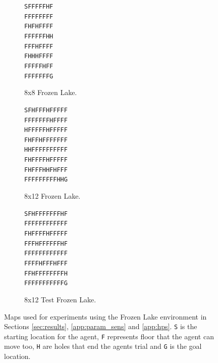             \begin{figure}
                \centering
                \begin{subfigure}[b]{0.3\textwidth}
                    \centering
                    \texttt{SFFFFFHF} \\
                    \texttt{FFFFFFFF} \\
                    \texttt{FHFHFFFF} \\
                    \texttt{FFFFFFHH} \\
                    \texttt{FFFHFFFF} \\
                    \texttt{FHHHFFFF} \\
                    \texttt{FFFFFHFF} \\
                    \texttt{FFFFFFFG} 
                    \caption{8x8 Frozen Lake.}
                    \label{fig:fl8}
                \end{subfigure}
                \hfill
                \begin{subfigure}[b]{0.3\textwidth}
                    \centering
                    \texttt{SFHFFFHFFFFF} \\
                    \texttt{FFFFFFFHFFFF} \\
                    \texttt{HFFFFFHFFFFF} \\
                    \texttt{FHFFHFFFFFFF} \\
                    \texttt{HHFFFFFFFFFF} \\
                    \texttt{FHFFFFHFFFFF} \\
                    \texttt{FHFFFHHFHFFF} \\
                    \texttt{FFFFFFFFFHHG} 
                    \caption{8x12 Frozen Lake.}
                    \label{fig:fl12}
                \end{subfigure}
                \hfill
                \begin{subfigure}[b]{0.3\textwidth}
                    \centering
                    \texttt{SFHFFFFFFFHF} \\
                    \texttt{FFFFFFFFFFFF} \\
                    \texttt{FHFFFFHFFFFF} \\
                    \texttt{FFFHFFFFFFHF} \\
                    \texttt{FFFFFFFFFFFF} \\
                    \texttt{FFFFHFFFHFFF} \\
                    \texttt{FFHFFFFFFFFH} \\
                    \texttt{FFFFFFFFFFFG} 
                    \caption{8x12 Test Frozen Lake.}
                    \label{fig:fl12test}
                \end{subfigure}
                \caption{Maps used for experiments using the Frozen Lake environment in Sections \ref{sec:results}, \ref{app:param_sens} and \ref{app:hps}. \texttt{S} is the starting location for the agent, \texttt{F} represents floor that the agent can move too, \texttt{H} are holes that end the agents trial and \texttt{G} is the goal location.}
                    \label{fig:maps}
            \end{figure}

